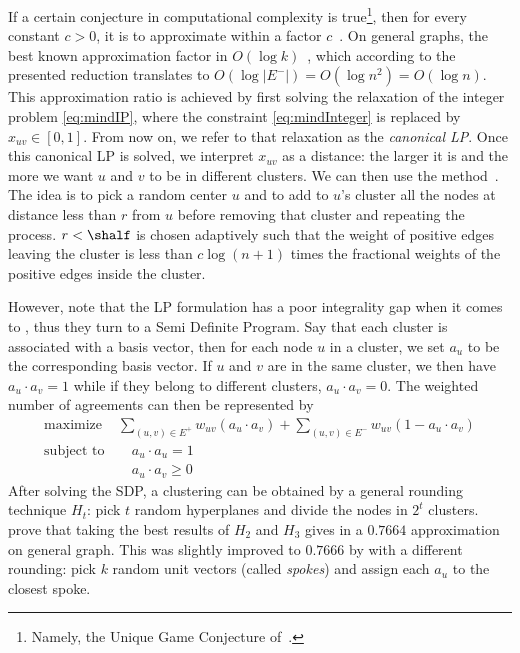If a certain conjecture in computational complexity is true\footnote{Namely, the Unique Game
Conjecture of~\textcite{UGC02}.}, then for every constant $c>0$, it is \NPh{} to approximate \mmc{}
within a factor $c$~\autocite{MulticutHardness06}. On general graphs, the best known approximation factor in $O(\log
k)$~\autocite{RegionGrowing93}, which according to the presented reduction translates to
$O(\log|E^-|)=O(\log n^2)=O(\log n)$. This approximation ratio is achieved by first solving the
relaxation of the integer problem \eqref{eq:mindIP}, where the constraint \eqref{eq:mindInteger} is
replaced by $x_{uv}\in [0,1]$. From now on, we refer to that relaxation as the \emph{canonical
\mind{} LP}. Once this canonical \mind{} LP is solved, we interpret $x_{uv}$ as a distance: the
larger it is and the more we want $u$ and $v$ to be in different clusters. We can then use the
\regionGrow{} method~\autocite{RegionGrowing93}. The idea is to pick a random center $u$ and to add
to $u$'s cluster all the nodes at distance less than $r$ from $u$ before removing that cluster and
repeating the process. $r<\shalf$ is chosen adaptively such that the weight of positive edges
leaving the cluster is less than $c\log(n+1)$ times the fractional weights of the positive edges
inside the cluster.

However, \textcite[Theorem 2]{Charikar2003} note that the LP formulation has a poor integrality gap
when it comes to \maxa{}, thus they turn to a Semi Definite Program. Say that each cluster is
associated with a basis vector, then for each node $u$ in a cluster, we set $a_u$ to be the
corresponding basis vector. If $u$ and $v$ are in the same cluster, we then have $a_u\cdot a_v = 1$
while if they belong to different clusters, $a_u\cdot a_v = 0$. The weighted number of agreements
can then be represented by
\begin{align}
   \label{eq:maxaSDP}
   \text{maximize } & \sum_{(u,v)\in E^+} w_{uv}(a_u\cdot a_v) + \sum_{(u,v)\in E^-} w_{uv}(1-a_u\cdot a_v) \\
   \text{subject to}& \quad a_u\cdot a_u=1 \nonumber\\
   \phantom{subject to}& \quad a_u\cdot a_v\geq 0  \nonumber
\end{align}
After solving the SDP, a clustering can be obtained by a general rounding technique $H_t$: pick $t$
random hyperplanes and divide the nodes in $2^t$ clusters. \Textcite[Theorem 3]{Charikar2003} prove
that taking the best results of $H_2$ and $H_3$ gives in a $0.7664$ approximation on general graph.
This was slightly improved to $0.7666$ by \textcite{Swamy2004} with a different rounding: pick $k$
random unit vectors (called \emph{spokes}) and assign each $a_u$ to the closest spoke.

